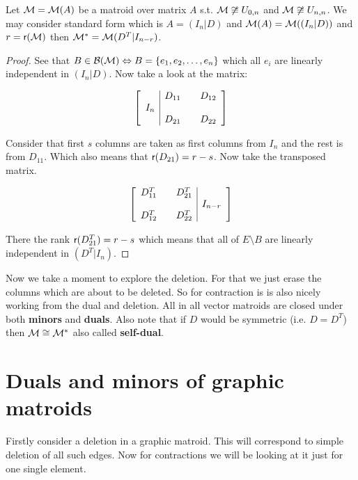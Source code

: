 \begin{thm}
	Let $\mathcal{M} = \mathcal{M}(A)$ be a matroid over matrix $A$ s.t. $\mathcal{M} \not\cong U_{0,n}$ and $\mathcal{M} \not\cong U_{n,n}$. We may consider standard form which is $A = (I_n | D)$ and $\mathcal{M}(A) = \mathcal{M}((I_n|D))$ and $r = \operatorname{\textsf{r}} (\mathcal{M})$ then $\mathcal{M}^{\ast} = \mathcal{M}(D^T | I_{n-r})$.
\end{thm}

\begin{proof}
	See that $B \in \mathcal{B}(\mathcal{M}) \Leftrightarrow B = \{e_1, e_2, \dots, e_n\}$ which all $e_i$ are linearly independent in $(I_n |D)$. Now take a look at the matrix:
	
	$$
	\left[
	\begin{array}{c | c c c}
		& D_{11} &  & D_{12} \\
		I_n & & & \\
		& D_{21} &  & D_{22}
	\end{array}
	\right]
	$$
	
	Consider that first $s$ columns are taken as first columns from $I_n$ and the rest is from $D_{11}$. Which also means that $\operatorname{\textsf{r}} (D_{21}) = r - s$. Now take the transposed matrix.
	
	$$
	\left[
	\begin{array}{c c c | c}
		D_{11}^T &  & D_{21}^T & \\
		& & & I_{n-r} \\
		D_{12}^T &  & D_{22}^T &
	\end{array}
	\right]
	$$
	
	There the rank $\operatorname{\textsf{r}} (D_{21}^T) = r-s$ which means that all of $E \setminus B$ are linearly independent in $(D^T | I_n)$.
\end{proof}

Now we take a moment to explore the deletion. For that we just erase the columns which are about to be deleted. So for contraction is is also nicely working from the dual and deletion. All in all vector matroids are closed under both \textbf{minors} and \textbf{duals}. Also note that if $D$ would be symmetric (i.e. $D = D^T$) then $\mathcal{M} \cong \mathcal{M}^{\ast}$ also called \textbf{self-dual}.

\section{Duals and minors of graphic matroids}

Firstly consider a deletion in a graphic matroid. This will correspond to simple deletion of all such edges. Now for contractions we will be looking at it just for one single element.

